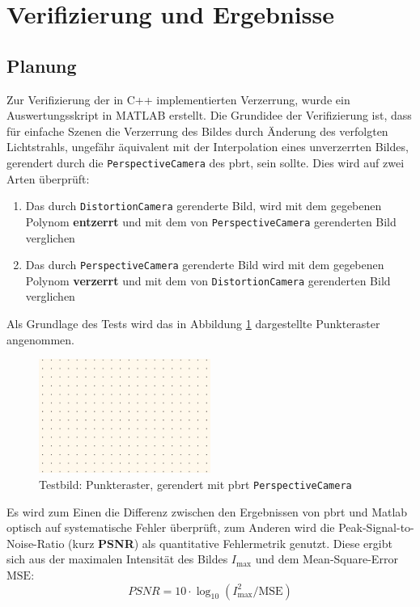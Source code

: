 \newpage
\section{Verifizierung und Ergebnisse}
\subsection{Planung}
Zur Verifizierung der in C++ implementierten Verzerrung, wurde ein Auswertungsskript in MATLAB erstellt. Die Grundidee der Verifizierung ist, dass für einfache Szenen die Verzerrung des Bildes durch Änderung des verfolgten Lichtstrahls, ungefähr äquivalent mit der Interpolation eines unverzerrten Bildes, gerendert durch die \texttt{PerspectiveCamera} des pbrt, sein sollte.
Dies wird auf zwei Arten überprüft:
\begin{enumerate}
	\item Das durch \texttt{DistortionCamera} gerenderte Bild, wird mit dem gegebenen Polynom \textbf{entzerrt} und mit dem von \texttt{PerspectiveCamera} gerenderten Bild verglichen
	\item Das durch \texttt{PerspectiveCamera} gerenderte Bild wird mit dem gegebenen Polynom \textbf{verzerrt} und mit dem von \texttt{DistortionCamera} gerenderten Bild verglichen
\end{enumerate}

Als Grundlage des Tests wird das in Abbildung \ref{fig:test_img} dargestellte Punkteraster angenommen. 

\begin{figure}[h]
	\centering
	\includegraphics[width=0.5\textwidth]{img/dot_perspective.png}
	\caption{Testbild: Punkteraster, gerendert mit pbrt \texttt{PerspectiveCamera}}
	\label{fig:test_img}
\end{figure}

Es wird zum Einen die Differenz zwischen den Ergebnissen von pbrt und Matlab optisch auf systematische Fehler überprüft, zum Anderen wird die Peak-Signal-to-Noise-Ratio (kurz \textbf{PSNR}) als quantitative Fehlermetrik genutzt.
Diese ergibt sich aus der maximalen Intensität des Bildes $I_\text{max}$ und dem Mean-Square-Error $\text{MSE}$:
\begin{equation}
	PSNR = 10\cdot \log_{10} (I_\text{max}^2/\text{MSE})
\end{equation}

